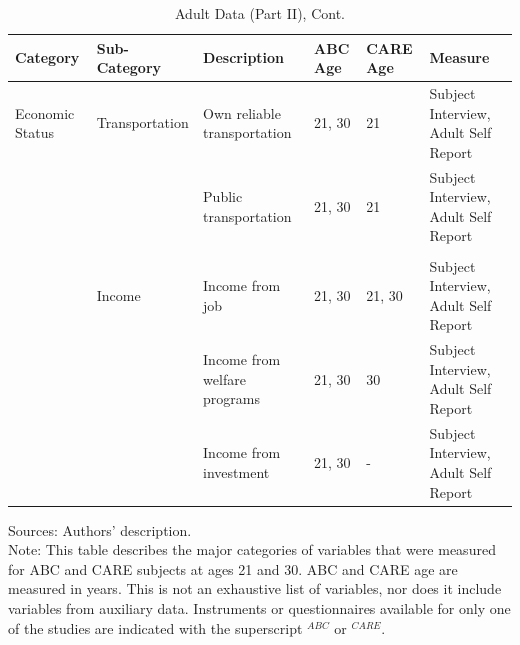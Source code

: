 \documentclass[static]{JJH-Beamer}
\begin{document}
\begin{frame}

\begin{table}[H]
\addtocounter{table}{-1}
\caption{Adult Data (Part II), Cont.}
\begin{center}
\begin{tiny}
\begin{tabular}{L{1.1cm} C{1.4cm} C{2.5cm} C{.8cm} C{.8cm} C{3cm}}
\toprule
\textbf{Category}	&	\textbf{Sub-Category}	&	\textbf{Description}	&	\textbf{ABC Age}  	&  \textbf{CARE Age}  & 	\textbf{Measure}	\\ \midrule										
Economic Status	&	Transportation	&	Own reliable transportation	&	21, 30	&	21	&	Subject Interview, Adult Self Report	\\
	&		&	Public transportation	&	21, 30	&	21	&	Subject Interview, Adult Self Report	\\
\\											
	&	Income	&	Income from job	&	21, 30	&	21, 30	&	Subject Interview, Adult Self Report	\\
	&		&	Income from welfare programs	&	21, 30	&	30	&	Subject Interview, Adult Self Report	\\
	&		&	Income from investment	&	21, 30	&	-	&	Subject Interview, Adult Self Report	\\										
 \bottomrule
\end{tabular}					
\end{tiny}
\end{center}												
\end{table}

\end{frame}

{\flushleft \normalsize Sources: Authors' description. \\				
Note: This table describes the major categories of variables that were measured for ABC and CARE subjects at ages 21 and 30. ABC and CARE age are measured in years. This is not an exhaustive list of variables, nor does it include variables from auxiliary data. Instruments or questionnaires available for only one of the studies are indicated with the superscript $^{ABC}$ or $^{CARE}$.\\}	
\end{document}
